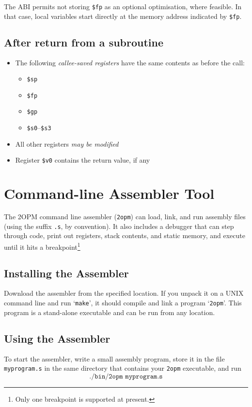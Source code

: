 \documentclass{article}
\begin{document}
    The ABI permits not storing \texttt{\$fp} as an optional
    optimisation, where feasible.
    In that case, local variables start directly
    at the memory address indicated by \texttt{\$fp}.

\subsection{After return from a subroutine}
  \begin{itemize}
    \item The following \emph{callee-saved registers} have the same contents as before the call:
      \begin{itemize}
        \item \texttt{\$sp}
        \item \texttt{\$fp}
        \item \texttt{\$gp}
        \item \texttt{\$s0}--\texttt{\$s3}
      \end{itemize}
    \item All other registers \emph{may be modified}
    \item Register \texttt{\$v0} contains the return value, if any
  \end{itemize}

\section{Command-line Assembler Tool}

The 2OPM command line assembler (\texttt{2opm}) can load, link, and run assembly files
(using the suffix \texttt{.s}, by convention).  It also includes a debugger that can step
through code, print out registers, stack contents, and static memory, and execute until it hits a breakpoint\footnote{
Only one breakpoint is supported at present.}

\subsection{Installing the Assembler}
Download the assembler from the specified location.  If you unpack it
on a UNIX command line and run `\texttt{make}', it should compile
and link a program `\texttt{2opm}'.  This program is a stand-alone executable
and can be run from any location.

\subsection{Using the Assembler}
To start the assembler, write a small assembly program, store it in the file \texttt{myprogram.s} in the same
directory that contains your \texttt{2opm} executable, and run
\[
\texttt{./bin/2opm myprogram.s}
\]
\end{document}
